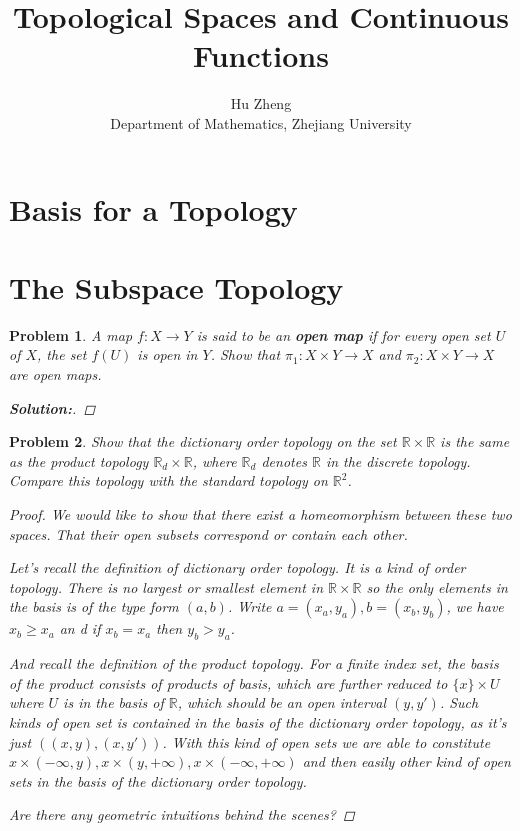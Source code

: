 \documentclass[11pt]{article}
\title{Topological Spaces and Continuous Functions}
\author{Hu Zheng \\ Department of Mathematics, Zhejiang University}
\newcommand{\mr}{\mathbb{R}}
\newtheorem{problem}{Problem}
\numberwithin{problem}{section}
\newenvironment{solution}
               {\let\oldqedsymbol=\qedsymbol
                \renewcommand{\qedsymbol}{$\blacktriangleleft$}
                \begin{proof}[\bfseries\upshape Solution:]}
               {\end{proof}
                \renewcommand{\qedsymbol}{\oldqedsymbol}}
\begin{document}
\maketitle

\section{Basis for a Topology}

\section{The Subspace Topology}

\begin{problem}
A map $f:X\rightarrow Y$ is said to be an \textbf{\textit{open map}} if for every open set $U$ of $X$, the set $f(U)$ is open in $Y$. Show that $\pi_1: X\times Y\rightarrow X$ and $\pi_2: X\times Y\rightarrow X$ are open maps.



\begin{solution}



\end{solution}
\end{problem}

\begin{problem}
Show that the dictionary order topology on the set $\mr\times\mr$ is the same as the product topology $\mr_d\times\mr$, where $\mr_d$ denotes $\mr$ in the discrete topology. Compare this topology with the standard topology on $\mr^2$.
\begin{proof}
We would like to show that there exist a homeomorphism between these two spaces. That their open subsets correspond or contain each other.

Let's recall the definition of dictionary order topology. It is a kind of order topology. There is no largest or smallest element in $\mr\times \mr$ so the only elements in the basis is of the type form $(a, b)$. Write $a=(x_a, y_a), b=(x_b, y_b)$, we have $x_b \ge x_a$ an d if $x_b = x_a$ then $y_b > y_a$.

And recall the definition of the product topology. For a finite index set, the basis of the product consists of products of basis, which are further reduced to $\{x\}\times U$ where $U$ is in the basis of $\mr$, which should be an open interval $(y,y')$. Such kinds of open set is contained in the basis of the dictionary order topology, as it's just $((x, y), (x, y'))$. With this kind of open sets we are able to constitute $x\times(-\infty, y), x\times(y, +\infty), x\times(-\infty, +\infty)$ and then easily other kind of open sets in the basis of the dictionary order topology.

Are there any geometric intuitions behind the scenes?

\end{proof}
\end{problem}
\end{document}
